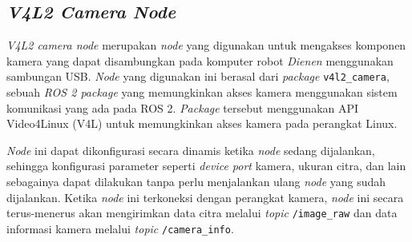\subsection{\emph{V4L2 Camera Node}}
\label{subsec:v4l2cameranode}

\emph{V4L2 camera node} merupakan \emph{node} yang digunakan untuk mengakses komponen kamera yang dapat disambungkan pada komputer robot \emph{Dienen} menggunakan sambungan USB.
\emph{Node} yang digunakan ini berasal dari \emph{package} \lstinline{v4l2_camera},
  sebuah \emph{ROS 2 package} yang memungkinkan akses kamera menggunakan sistem komunikasi yang ada pada ROS 2.
\emph{Package} tersebut menggunakan API Video4Linux (V4L) \citep{url:video4linux} untuk memungkinkan akses kamera pada perangkat Linux.

\emph{Node} ini dapat dikonfigurasi secara dinamis ketika \emph{node} sedang dijalankan,
  sehingga konfigurasi parameter seperti \emph{device port} kamera, ukuran citra, dan lain sebagainya dapat dilakukan tanpa perlu menjalankan ulang \emph{node} yang sudah dijalankan.
Ketika \emph{node} ini terkoneksi dengan perangkat kamera,
  \emph{node} ini secara terus-menerus akan mengirimkan data citra melalui \emph{topic} \lstinline{/image_raw} dan data informasi kamera melalui \emph{topic} \lstinline{/camera_info}.
